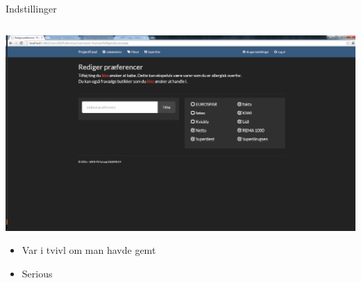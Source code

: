 \begin{frame}{Indstillinger}

	
	\begin{minipage}[0.3\textheight]{\textwidth}
	\begin{columns}[T]
	\begin{column}{1\textwidth}
	\vspace{-15 pt}
	 \includegraphics[width=1\textwidth,height=1\textheight,keepaspectratio, trim={1cm 0 0 16mm}, clip]{images/Screenshots/SettingsOld2.png}
	 
	 \begin{itemize}
	 	 	\item Var i tvivl om man havde gemt
	 	 	\item Serious
	 \end{itemize}
	
	\end{column}

	\end{columns}

  \end{minipage}
	
\end{frame}

